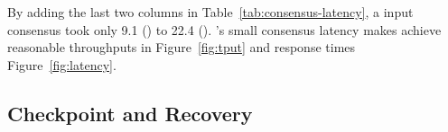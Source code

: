By adding the last two columns in Table~\ref{tab:consensus-latency}, a 
\xxx input consensus took only 9.1 \us (\redis) to 22.4 \us (\mediatomb). 
\xxx's small consensus latency makes \xxx achieve reasonable throughputs 
in Figure~\ref{fig:tput} and response times Figure~\ref{fig:latency}.














\subsection{Checkpoint and Recovery} \label{sec:robust}

